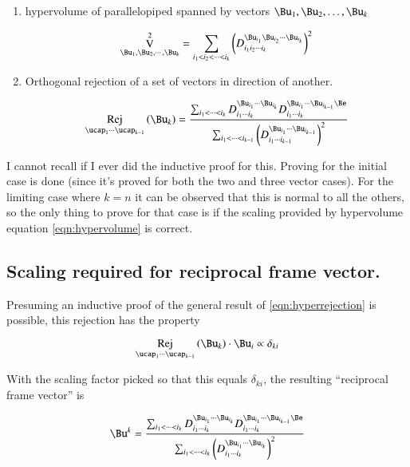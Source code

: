 \documentclass{article}      %
\DeclareMathOperator{\RejName}{Rej}
\newcommand{\Rej}[2]{\RejName_{#1}\left( {#2} \right)}
\DeclareMathOperator{\VName}{V}
\newcommand{\VolumeOp}[1]{\VName_{#1}}
\begin{document}
\begin{enumerate}
\item hypervolume of parallelopiped spanned by vectors $\Bu_1, \Bu_2, \dots, \Bu_k$

\begin{equation} \label{eqn:hypervolume}
\VolumeOp{\Bu_1, \Bu_2, \cdots, \Bu_k}^2
=
\sum_{i_1 < i_2 < \cdots < i_k } \left(
D_{i_1 i_2 \cdots i_k}^{\Bu_{i_1} \Bu_{i_2} \cdots \Bu_{i_k}}
\right)^2
\end{equation}

\item Orthogonal rejection of a set of vectors in direction of another.

\begin{equation} \label{eqn:hyperrejection}
\Rej{\ucap_1\cdots\ucap_{k-1}}{\Bu_k} = 
\frac{
\sum_{i_1 < \cdots < i_{k} } 
D_{i_1 \cdots i_{k}}^{\Bu_{i_1} \cdots \Bu_{i_{k}}}
D_{i_1 \cdots i_{k}}^{\Bu_{i_1} \cdots \Bu_{i_{k-1}} \Be }}
{
\sum_{i_1 < \cdots < i_{k-1} } \left(D_{i_1 \cdots i_{k-1}}^{\Bu_{i_1} \cdots \Bu_{i_{k-1}}}\right)^2
}
\end{equation}
\end{enumerate}

I cannot recall if I ever did the inductive proof for this.
Proving for the initial case is done (since it's proved for both the 
two and three vector cases).  For the limiting case where $k=n$ it can be observed that this is normal to all the others, so the
only thing to prove for that case is if the scaling provided by hypervolume equation \ref{eqn:hypervolume} is correct.

\subsection{ Scaling required for reciprocal frame vector. }

Presuming an inductive proof of the general result of \ref{eqn:hyperrejection} is possible, this rejection
has the property

\begin{equation*}
\Rej{\ucap_1\cdots\ucap_{k-1}}{\Bu_k} \cdot \Bu_i \propto \delta_{ki}
\end{equation*}

With the scaling factor picked so that this equals $\delta_{ki}$, the resulting ``reciprocal frame vector'' is

\begin{equation} \label{eqn:framevec}
\Bu^k =
\frac{
\sum_{i_1 < \cdots < i_{k} } 
D_{i_1 \cdots i_{k}}^{\Bu_{i_1} \cdots \Bu_{i_{k}}}
D_{i_1 \cdots i_{k}}^{\Bu_{i_1} \cdots \Bu_{i_{k-1}} \Be }}
{
\sum_{i_1 < \cdots < i_{k} } \left(D_{i_1 \cdots i_{k}}^{\Bu_{i_1} \cdots \Bu_{i_{k}}}\right)^2
}
\end{equation}
\end{document}

